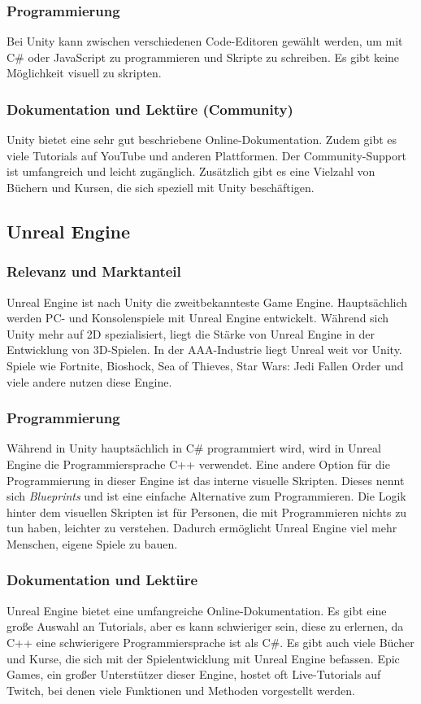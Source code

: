\subsubsection{Programmierung}
Bei Unity kann zwischen verschiedenen Code-Editoren gewählt werden, um mit C\# oder JavaScript zu programmieren und Skripte zu schreiben. Es gibt keine Möglichkeit visuell zu skripten.

\subsubsection{Dokumentation und Lektüre (Community)}
Unity bietet eine sehr gut beschriebene Online-Dokumentation. Zudem gibt es viele Tutorials auf YouTube und anderen Plattformen. Der Community-Support ist umfangreich und leicht zugänglich. Zusätzlich gibt es eine Vielzahl von Büchern und Kursen, die sich speziell mit Unity beschäftigen.

\pagebreak

\subsection{Unreal Engine}
\subsubsection{Relevanz und Marktanteil}
Unreal Engine ist nach Unity die zweitbekannteste Game Engine. Hauptsächlich werden PC- und Konsolenspiele mit Unreal Engine entwickelt. Während sich Unity mehr auf 2D spezialisiert, liegt die Stärke von Unreal Engine in der Entwicklung von 3D-Spielen. In der AAA-Industrie liegt Unreal weit vor Unity. Spiele wie Fortnite, Bioshock, Sea of Thieves, Star Wars: Jedi Fallen Order und viele andere nutzen diese Engine.

\subsubsection{Programmierung}
Während in Unity hauptsächlich in C\# programmiert wird, wird in Unreal Engine die Programmiersprache C++ verwendet. Eine andere Option für die Programmierung in dieser Engine ist das interne visuelle Skripten. Dieses nennt sich \textit{Blueprints} und ist eine einfache Alternative zum Programmieren. Die Logik hinter dem visuellen Skripten ist für Personen, die mit Programmieren nichts zu tun haben, leichter zu verstehen. Dadurch ermöglicht Unreal Engine viel mehr Menschen, eigene Spiele zu bauen.

\subsubsection{Dokumentation und Lektüre}
Unreal Engine bietet eine umfangreiche Online-Dokumentation. Es gibt eine große Auswahl an Tutorials, aber es kann schwieriger sein, diese zu erlernen, da C++ eine schwierigere Programmiersprache ist als C\#. Es gibt auch viele Bücher und Kurse, die sich mit der Spielentwicklung mit Unreal Engine befassen. Epic Games, ein großer Unterstützer dieser Engine, hostet oft Live-Tutorials auf Twitch, bei denen viele Funktionen und Methoden vorgestellt werden.

